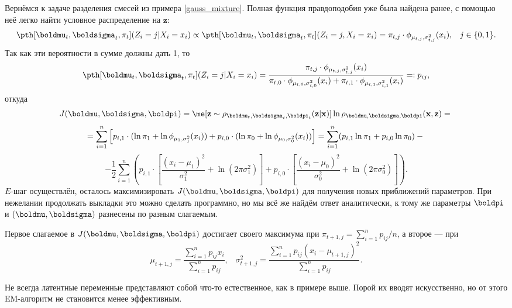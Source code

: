 \begin{example}
	Вернёмся к задаче разделения смесей из примера \ref{gauss_mixture}. Полная функция правдоподобия уже была найдена ранее, с помощью неё легко найти условное распределение на $\mathbf z$:
	\[
	\pth[\boldmu_t, \boldsigma_t, \pi_t](Z_i = j | X_i = x_i) \propto \pth[\boldmu_t, \boldsigma_t, \pi_t](Z_i = j, X_i = x_i) = \pi_{t,j} \cdot \phi_{\mu_{t,j}, \sigma_{t,j}^2}(x_i), \;\;\; j \in \{0, 1\}.
	\]
	Так как эти вероятности в сумме должны дать 1, то
	\[
	\pth[\boldmu_t, \boldsigma_t, \pi_t](Z_i = j | X_i = x_i) = \frac{\pi_{t,j} \cdot \phi_{\mu_{t,j}, \sigma_{t,j}^2}(x_i)}{\pi_{t,0} \cdot \phi_{\mu_{t,0}, \sigma_{t,0}^2}(x_i) + \pi_{t,1} \cdot \phi_{\mu_{t,1}, \sigma_{t,1}^2}(x_i)} =: p_{ij},
	\]
	откуда
	\[
	J(\boldmu, \boldsigma, \boldpi) = \me[\mathbf z \sim \rho_{\boldmu_t, \boldsigma_t, \boldpi_t}(\mathbf z | \mathbf x)] \ln \rho_{\boldmu, \boldsigma, \boldpi}(\mathbf x, \mathbf z) = \\
	\]
	\[
	= \sum_{i=1}^n \left[ p_{i,1} \cdot (\ln \pi_1 + \ln \phi_{\mu_1, \sigma_1^2}(x_i)) + p_{i,0} \cdot (\ln \pi_0 + \ln \phi_{\mu_0, \sigma_0^2}(x_i))\right] = \sum_{i=1}^n (p_{i,1} \ln \pi_1 + p_{i,0} \ln \pi_0) - \\
	\]
	\[
	- \frac{1}{2} \sum_{i=1}^n \left(p_{i,1} \cdot \left[\frac{(x_i - \mu_1)^2}{\sigma_1^2} + \ln(2\pi\sigma^2_1)\right] + p_{i,0} \cdot \left[\frac{(x_i - \mu_0)^2}{\sigma_0^2} + \ln(2\pi\sigma^2_0)\right]\right).
	\]
	$E$-шаг осуществлён, осталось максимизировать $J(\boldmu, \boldsigma, \boldpi)$ для получения новых приближений параметров. При нежелании продолжать выкладки это можно сделать программно, но мы всё же найдём ответ аналитически, к тому же параметры $\boldpi$ и $(\boldmu, \boldsigma)$ разнесены по разным слагаемым.
	
	Первое слагаемое в $J(\boldmu, \boldsigma, \boldpi)$ достигает своего максимума при $\pi_{t+1,j} = \sum_{i=1}^n p_{ij} / n$, а второе --- при
	\[
	\mu_{t+1,j} = \frac{\sum_{i=1}^n p_{ij} x_i}{\sum_{i=1}^n p_{ij}}, \;\;\; \sigma^2_{t+1,j} = \frac{\sum_{i=1}^n p_{ij} (x_i - \mu_{t+1,j})^2}{\sum_{i=1}^n p_{ij}}.
	\]
\end{example}

Не всегда латентные переменные представляют собой что-то естественное, как в примере выше. Порой их вводят искусственно, но от этого EM-алгоритм не становится менее эффективным.

